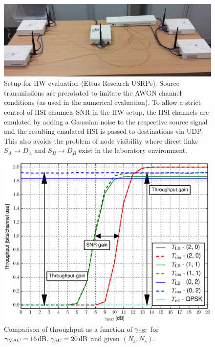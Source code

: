 \documentclass{article}
\begin{document}
\begin{figure}
\centering{}\includegraphics[width=0.95\columnwidth]{fig/20150109_143009}\caption{Setup for HW evaluation (Ettus Research
USRPs). Source transmissions are prerotated \cite{Koike-Popovski-Tarokh_2009a,Zhang-Liew_2010,Anxin-Yuan-Kayama_2008}
to imitate the AWGN channel conditions (as used in the numerical evaluation).
To allow a strict control of HSI channels SNR in the HW
setup, the HSI channels are emulated by adding a Gaussian noise to
the respective source signal and the resulting emulated HSI is passed
to destinations via UDP. This also avoids the problem of node visibility
where direct links $S_{A}\rightarrow D_{A}$ and $S_{B}\rightarrow D_{B}$
exist in the laboratory environment.\label{fig:CTUpp_HW_setup}}
\end{figure}


\begin{figure}
\begin{centering}
\hspace*{-0.04\columnwidth}\includegraphics[width=0.95\columnwidth]{fig/Throughput_HSI_XOR_MAC16_BC20_N2}
\par\end{centering}

\caption{Comparison of throughput as a function of $\gamma_{{\rm {HSI}}}$
for $\gamma_{{\rm {MAC}}}=16\,\mathrm{dB},\,\gamma_{{\rm {BC}}}=20\,\mathrm{dB}$
and given $(N_{b},N_{s})$. \label{fig:CTUpp_Throughput16_20}}
\end{figure}
\end{document}
